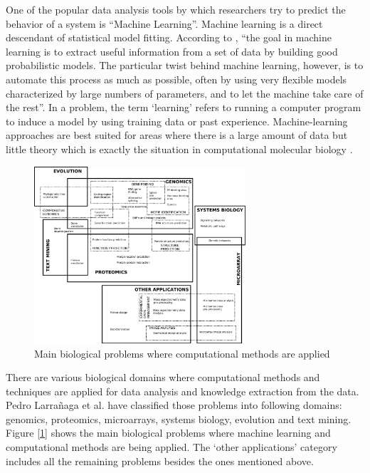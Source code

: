 One of the popular data analysis tools by which researchers try to predict the behavior of a system is “Machine Learning”. 
Machine learning is a direct descendant of statistical model fitting. According to \cite{baldi_bioinformatics_2001}, 
“the goal in machine learning is to extract useful information from a set of data by building good probabilistic models. 
The particular twist behind machine learning, however, is to automate this process as much as possible, often by using 
very flexible models characterized by large numbers of parameters, and to let the machine take care of the rest”. 
In a problem, the term ‘learning’ refers to running a computer program to induce a model by using training data or 
past experience.  Machine-learning approaches are best suited for areas where there is a large amount of data 
but little theory which is exactly the situation in computational molecular biology \cite{chauvin_backpropagation_1995}.

\begin{figure}[ht]
    \centering
    \includegraphics[width=0.70\textwidth]{figures/06BioinformaticsTopics.jpg}
    \caption{Main biological problems where computational methods are applied \cite{larranaga_machine_2006}}
    \label{fig:bioinformaticsTopics}
\end{figure}

There are various biological domains where computational methods and techniques are applied for data analysis and knowledge 
extraction from the data. Pedro Larrañaga et al. \cite{larranaga_machine_2006} have classified those problems into 
following domains: genomics, proteomics, microarrays, systems biology, evolution and text mining. 
Figure [\ref{fig:bioinformaticsTopics}] shows the main biological problems where machine learning and computational methods 
are being applied. The ‘other applications’ category includes all the remaining problems besides the ones mentioned above.

